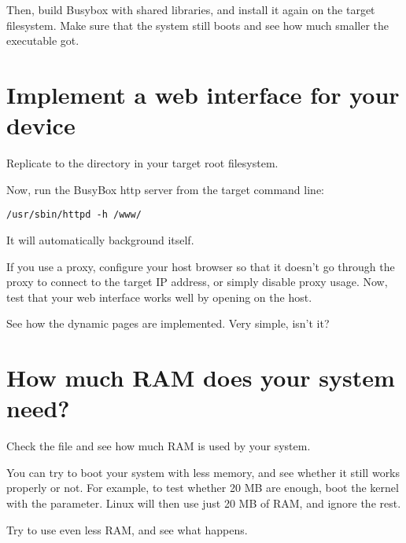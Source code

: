 Then, build Busybox with shared libraries, and install it again on the
target filesystem. Make sure that the system still boots and see
how much smaller the  executable got.

\section{Implement a web interface for your device}

Replicate  to the  directory in your target root filesystem.

Now, run the BusyBox http server from the target command line:

\begin{verbatim}
/usr/sbin/httpd -h /www/
\end{verbatim}

It will automatically background itself.

If you use a proxy, configure your host browser so that it doesn't go
through the proxy to connect to the target IP address, or simply
disable proxy usage.  Now, test that your web interface works well by
opening  on the host.

See how the dynamic pages are implemented. Very simple, isn't it?

\section{How much RAM does your system need?}

Check the  file and see how much RAM is used by your
system.

You can try to boot your system with less memory, and see whether it
still works properly or not. For example, to test whether 20 MB are
enough, boot the kernel with the  parameter. Linux will then
use just 20 MB of RAM, and ignore the rest.

Try to use even less RAM, and see what happens.
